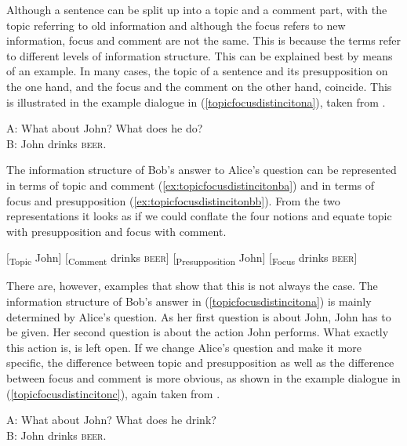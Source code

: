 Although a sentence can be split up into a topic and a comment part, with the topic referring to old information and although the focus refers to new information, focus and comment are not the same. This is because the terms refer to different levels of information structure. This can be explained best by means of an example. In many cases, the topic of a sentence and its presupposition on the one hand, and the focus and the comment on the other hand, coincide. This is illustrated in the example dialogue in (\ref{topicfocusdistincitona}), taken from \citet[467]{vallduvi1996linguistic}.

\begin{exe}
\ex\label{topicfocusdistincitona}
A: What about John? What does he do? \\
B: John drinks \textsc{beer}.
\end{exe}

\noindent The information structure of Bob's answer to Alice's question can be represented in terms of topic and comment (\ref{ex:topicfocusdistincitonba}) and in terms of focus and presupposition (\ref{ex:topicfocusdistincitonbb}). From the two representations it looks as if we could conflate the four notions and equate topic with presupposition and focus with comment.

\begin{exe}
\ex\label{topicfocusdistincitonb}\begin{xlist} 
\ex $[$\textsubscript{Topic} John$]$ $[$\textsubscript{Comment} drinks \textsc{beer}$]$ \label{ex:topicfocusdistincitonba}
\ex $[$\textsubscript{Presupposition} John$]$ $[$\textsubscript{Focus} drinks \textsc{beer}$]$ \label{ex:topicfocusdistincitonbb}
\end{xlist}
\end{exe}

\noindent There are, however, examples that show that this is not always the case. The information structure of Bob's answer in (\ref{topicfocusdistincitona}) is mainly determined by Alice's question. As her first question is about John, John has to be given. Her second question is about the action John performs. What exactly this action is, is left open. If we change Alice's question and make it more specific, the difference between topic and presupposition as well as the difference between focus and comment is more obvious, as shown in the example dialogue in (\ref{topicfocusdistincitonc}), again taken from \citet[468]{vallduvi1996linguistic}.

\begin{exe}
\ex\label{topicfocusdistincitonc}
A: What about John? What does he drink? \\
B: John drinks \textsc{beer}.
\end{exe}

